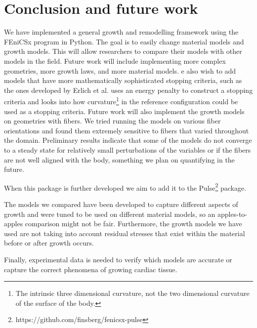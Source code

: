 \section{Conclusion and future work}
We have implemented a general growth and remodelling framework using the FEniCSx program in Python. The goal is to easily change material models and growth models. This will allow researchers to compare their models with other models in the field. Future work will include implementing more complex geometries, more growth laws, and more material models.  e also wish to add models that have more mathematically sophisticated stopping criteria, such as the ones developed by Erlich et al. \citep{Erlich2023} uses an energy penalty to construct a stopping criteria and \citep{Erlich2024} looks into how curvature\footnote{The intrinsic three dimensional curvature, not the two dimensional curvature of the surface of the body.} in the reference configuration could be used as a stopping criteria. Future work will also implement the growth models on geometries with fibers. We tried running the models on various fiber orientations and found them extremely sensitive to fibers that varied throughout the domain. Preliminary results indicate that some of the models do not converge to a steady state for relatively small perturbations of the variables or if the fibers are not well aligned with the body, something we plan on quantifying in the future. \par
When this package is further developed we aim to add it to the Pulse\footnote{https://github.com/finsberg/fenicsx-pulse} package. \par
The models we compared have been developed to capture different aspects of growth and were tuned to be used on different material models, so an apples-to-apples comparison might not be fair. Furthermore, the growth models we have used are not taking into account residual stresses that exist within the material before or after growth occurs. \par
Finally, experimental data is needed to verify which models are accurate or capture the correct phenomena of growing cardiac tissue.


% 

